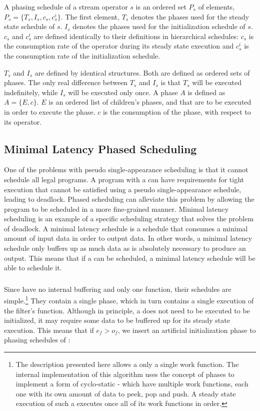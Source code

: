 A phasing schedule of a stream operator $s$ is an ordered set
$P_s$ of elements, $P_s = \{T_s, I_s, c_s, c^i_s\}$.  The first
element, $T_s$ denotes the phases used for the steady state
schedule of $s$. $I_s$ denotes the phases used for the
initialization schedule of $s$. $c_s$ and $c^i_s$ are defined
identically to their definitions in hierarchical schedules: $c_s$
is the consumption rate of the operator during its steady state
execution and $c^i_s$ is the consumption rate of the
initialization schedule.

$T_s$ and $I_s$ are defined by identical structures.  Both are
defined as ordered sets of phases. The only real difference
between $T_s$ and $I_s$ is that $T_s$ will be executed
indefinitely, while $I_s$ will be executed only once. A phase $A$
is defined as $A = \{E, c\}$.  $E$ is an ordered list of
children's phases, {\splitters} and {\joiners} that are to be
executed in order to execute the phase. $c$ is the consumption of
the phase, with respect to its operator.

\subsection{Minimal Latency Phased Scheduling}
\label{sec:min-latency}

One of the problems with pseudo single-appearance scheduling is
that it cannot schedule all legal {\StreamIt} programs.  A program
with a {\feedbackloop} can have requirements for tight execution
that cannot be satisfied using a pseudo single-appearance
schedule, leading to deadlock. Phased scheduling can alleviate
this problem by allowing the program to be scheduled in a more
fine-grained manner. Minimal latency scheduling is an example of a
specific scheduling strategy that solves the problem of deadlock.
A minimal latency schedule is a schedule that consumes a minimal
amount of input data in order to output data. In other words, a
minimal latency schedule only buffers up as much data as is
absolutely necessary to produce an output. This means that if a
{\feedbackloop} can be scheduled, a minimal latency schedule will
be able to schedule it.

\subsubsection{\filter}

Since {\filters} have no internal buffering and only one {\work}
function, their schedules are simple.\footnote{The description
presented here allows a {\filter} only a single work function. The
internal implementation of this algorithm uses the concept of
phases to implement a form of cyclo-static {\filters} - {\filters}
which have multiple work functions, each one with its own amount
of data to peek, pop and push. A steady state execution of such a
{\filter} executes once all of its work functions in order.} They
contain a single phase, which in turn contains a single execution
of the filter's {\work} function.  Although in principle, a
{\filter} does not need to be executed to be initialized, it may
require some data to be buffered up for its steady state
execution. This means that if $e_f > o_f$, we insert an artificial
initialization phase to phasing schedules of {\filters}:

